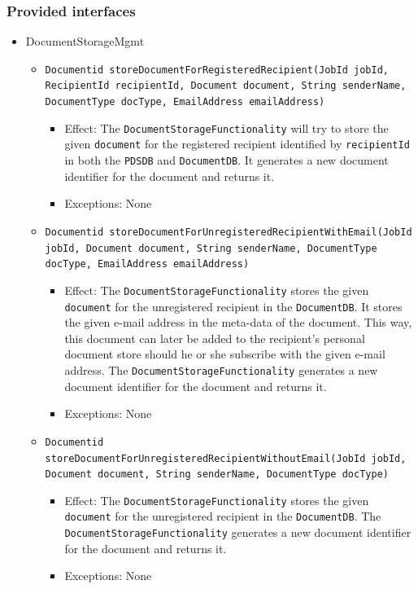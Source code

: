 \documentclass[a4paper,10pt]{article}
\begin{document}
\subsubsection*{Provided interfaces}
\begin{itemize}
    \item DocumentStorageMgmt
    \begin{itemize}
        \item \texttt{Documentid storeDocumentForRegisteredRecipient(JobId jobId, RecipientId recipientId, Document document, String senderName, DocumentType docType, EmailAddress emailAddress)}
        \begin{itemize}
            \item Effect: The \texttt{DocumentStorageFunctionality} will try to store the given \texttt{document} for the registered recipient identified by \texttt{recipientId} in both the \texttt{PDSDB} and \texttt{DocumentDB}. It generates a new document identifier for the document and returns it.
            \item Exceptions: None
		\end{itemize}
		
        \item \texttt{Documentid storeDocumentForUnregisteredRecipientWithEmail(JobId jobId, Document document, String senderName, DocumentType docType, EmailAddress emailAddress)}
        \begin{itemize}
            \item Effect: The \texttt{DocumentStorageFunctionality} stores the given \texttt{document} for the unregistered recipient in the \texttt{DocumentDB}. It stores the given e-mail address in the meta-data of the document. This way, this document can later be added to the recipient's personal document store should he or she subscribe with the given e-mail address. The \texttt{DocumentStorageFunctionality} generates a new document identifier for the document and returns it. 
            \item Exceptions: None
		\end{itemize}

        \item \texttt{Documentid storeDocumentForUnregisteredRecipientWithoutEmail(JobId jobId, Document document, String senderName, DocumentType docType)}
        \begin{itemize}
            \item Effect: The \texttt{DocumentStorageFunctionality} stores the given \texttt{document} for the unregistered recipient in the \texttt{DocumentDB}. The \texttt{DocumentStorageFunctionality} generates a new document identifier for the document and returns it. 
            \item Exceptions: None
		\end{itemize}


\end{itemize}
\end{itemize}
\end{document}
